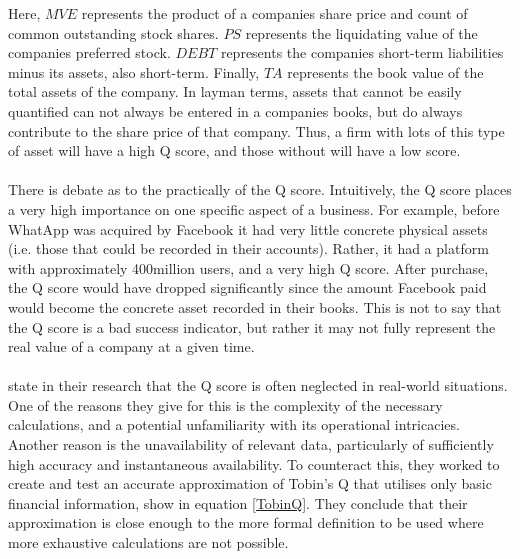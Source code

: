 {Here, $MVE$ represents the product of a companies share price and count of common outstanding stock shares. $PS$ represents the liquidating value of the companies preferred stock. $DEBT$ represents the companies short-term liabilities minus its assets, also short-term. Finally, $TA$ represents the book value of the total assets of the company. In layman terms, assets that cannot be easily quantified can not always be entered in a companies books, but do always contribute to the share price of that company. Thus, a firm with lots of this type of asset will have a high Q score, and those without will have a low score.\\\\ 
There is debate as to the practically of the Q score. Intuitively, the Q score places a very high importance on one specific aspect of a business. For example, before WhatApp was acquired by Facebook it had very little concrete physical assets (i.e. those that could be recorded in their accounts). Rather, it had a platform with approximately 400million users, and a very high Q score. After purchase, the Q score would have dropped significantly since the amount Facebook paid would become the concrete asset recorded in their books. This is not to say that the Q score is a bad success indicator, but rather it may not fully represent the real value of a company at a given time.\\\\    \cite{chung1994simple} state in their research that the Q score is often neglected in real-world situations. One of the reasons they give for this is the complexity of the necessary calculations, and a potential unfamiliarity with its operational intricacies. Another reason is the unavailability of relevant data, particularly of sufficiently high accuracy and instantaneous availability. To counteract this, they worked to create and test an accurate approximation of Tobin's Q that utilises only basic financial information, show in equation \ref{TobinQ}.  They conclude that their approximation is close enough to the more formal definition to be used where more exhaustive calculations are not possible. \\\\
}
